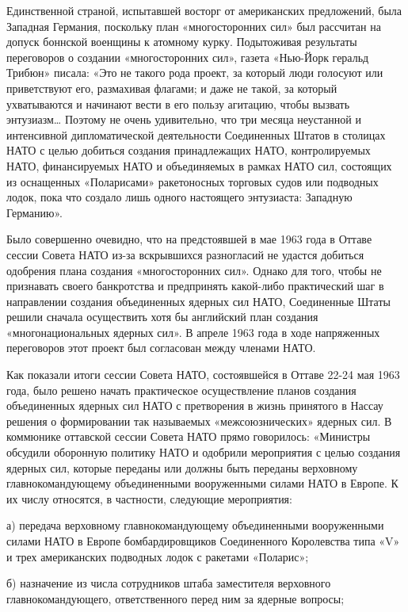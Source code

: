 \documentclass[12pt, a4paper, openany]{book}
\begin{document}
Единственной страной, испытавшей восторг от американских предложений, была Западная Германия, поскольку план «многосторонних сил» был рассчитан на допуск боннской военщины к атомному курку. Подытоживая результаты переговоров о создании «многосторонних сил», газета «Нью-Йорк геральд Трибюн» писала: «Это не такого рода проект, за который люди голосуют или приветствуют его, размахивая флагами; и даже не такой, за который ухватываются и начинают вести в его пользу агитацию, чтобы вызвать энтузиазм… Поэтому не очень удивительно, что три месяца неустанной и интенсивной дипломатической деятельности Соединенных Штатов в столицах НАТО с целью добиться создания принадлежащих НАТО, контролируемых НАТО, финансируемых НАТО и объединяемых в рамках НАТО сил, состоящих из оснащенных «Поларисами» ракетоносных торговых судов или подводных лодок, пока что создало лишь одного настоящего энтузиаста: Западную Германию».

Было совершенно очевидно, что на предстоявшей в мае 1963 года в Оттаве сессии Совета НАТО из-за вскрывшихся разногласий не удастся добиться одобрения плана создания «многосторонних сил». Однако для того, чтобы не признавать своего банкротства и предпринять какой-либо практический шаг в направлении создания объединенных ядерных сил НАТО, Соединенные Штаты решили сначала осуществить хотя бы английский план создания «многонациональных ядерных сил». В апреле 1963 года в ходе напряженных переговоров этот проект был согласован между членами НАТО.

Как показали итоги сессии Совета НАТО, состоявшейся в Оттаве 22-24 мая 1963 года, было решено начать практическое осуществление планов создания объединенных ядерных сил НАТО с претворения в жизнь принятого в Нассау решения о формировании так называемых «межсоюзнических» ядерных сил. В коммюнике оттавской сессии Совета НАТО прямо говорилось: «Министры обсудили оборонную политику НАТО и одобрили мероприятия с целью создания ядерных сил, которые переданы или должны быть переданы верховному главнокомандующему объединенными вооруженными силами НАТО в Европе. К их числу относятся, в частности, следующие мероприятия:

а) передача верховному главнокомандующему объединенными вооруженными силами НАТО в Европе бомбардировщиков Соединенного Королевства типа «V» и трех американских подводных лодок с ракетами «Поларис»;

б) назначение из числа сотрудников штаба заместителя верховного главнокомандующего, ответственного перед ним за ядерные вопросы;
\end{document}
